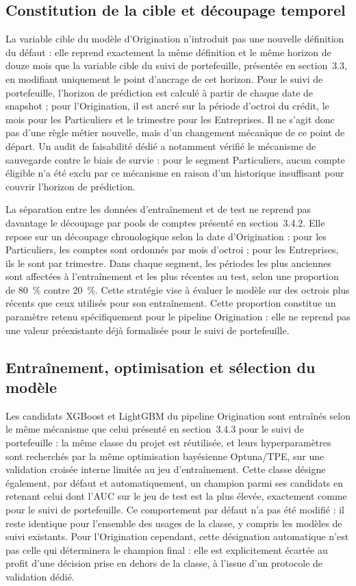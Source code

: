 \subsection{Constitution de la cible et découpage temporel}

La variable cible du modèle d'Origination n'introduit pas une nouvelle définition du défaut : elle reprend exactement la même définition et le même horizon de douze mois que la variable cible du suivi de portefeuille, présentée en section~3.3, en modifiant uniquement le point d'ancrage de cet horizon. Pour le suivi de portefeuille, l'horizon de prédiction est calculé à partir de chaque date de snapshot ; pour l'Origination, il est ancré sur la période d'octroi du crédit, le mois pour les Particuliers et le trimestre pour les Entreprises. Il ne s'agit donc pas d'une règle métier nouvelle, mais d'un changement mécanique de ce point de départ. Un audit de faisabilité dédié a notamment vérifié le mécanisme de sauvegarde contre le biais de survie : pour le segment Particuliers, aucun compte éligible n'a été exclu par ce mécanisme en raison d'un historique insuffisant pour couvrir l'horizon de prédiction.

La séparation entre les données d'entraînement et de test ne reprend pas davantage le découpage par pools de comptes présenté en section~3.4.2. Elle repose sur un découpage chronologique selon la date d'Origination : pour les Particuliers, les comptes sont ordonnés par mois d'octroi ; pour les Entreprises, ils le sont par trimestre. Dans chaque segment, les périodes les plus anciennes sont affectées à l'entraînement et les plus récentes au test, selon une proportion de 80~\% contre 20~\%. Cette stratégie vise à évaluer le modèle sur des octrois plus récents que ceux utilisés pour son entraînement. Cette proportion constitue un paramètre retenu spécifiquement pour le pipeline Origination : elle ne reprend pas une valeur préexistante déjà formalisée pour le suivi de portefeuille.

\subsection{Entraînement, optimisation et sélection du modèle}

Les candidats XGBoost et LightGBM du pipeline Origination sont entraînés selon le même mécanisme que celui présenté en section~3.4.3 pour le suivi de portefeuille : la même classe du projet est réutilisée, et leurs hyperparamètres sont recherchés par la même optimisation bayésienne Optuna/TPE, sur une validation croisée interne limitée au jeu d'entraînement. Cette classe désigne également, par défaut et automatiquement, un champion parmi ses candidats en retenant celui dont l'AUC sur le jeu de test est la plus élevée, exactement comme pour le suivi de portefeuille. Ce comportement par défaut n'a pas été modifié : il reste identique pour l'ensemble des usages de la classe, y compris les modèles de suivi existants. Pour l'Origination cependant, cette désignation automatique n'est pas celle qui déterminera le champion final : elle est explicitement écartée au profit d'une décision prise en dehors de la classe, à l'issue d'un protocole de validation dédié.


